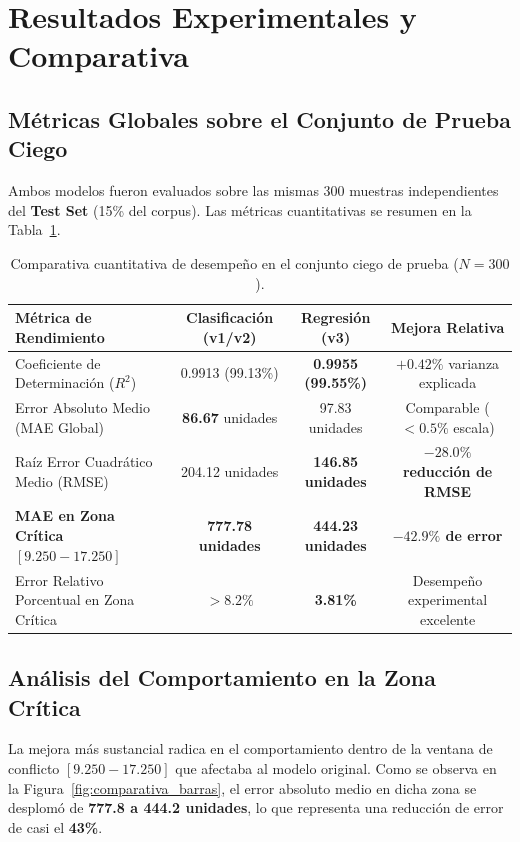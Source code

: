 \documentclass[11pt,a4paper]{article}
\begin{document}
\section{Resultados Experimentales y Comparativa}

\subsection{Métricas Globales sobre el Conjunto de Prueba Ciego}
Ambos modelos fueron evaluados sobre las mismas 300 muestras independientes del \textbf{Test Set} (15\% del corpus). Las métricas cuantitativas se resumen en la Tabla~\ref{tab:metricas_comparativas}.

\begin{table}[H]
\centering
\caption{Comparativa cuantitativa de desempeño en el conjunto ciego de prueba ($N = 300$).}
\label{tab:metricas_comparativas}
\vspace{0.2cm}
\begin{tabular}{lccc}
\toprule
\textbf{Métrica de Rendimiento} & \textbf{Clasificación (v1/v2)} & \textbf{Regresión (v3)} & \textbf{Mejora Relativa} \\
\midrule
Coeficiente de Determinación ($R^2$) & 0.9913 (99.13\%) & \textbf{0.9955 (99.55\%)} & $+0.42\%$ varianza explicada \\
Error Absoluto Medio (MAE Global) & \textbf{86.67} unidades & 97.83 unidades & Comparable ($<0.5\%$ escala) \\
Raíz Error Cuadrático Medio (RMSE) & 204.12 unidades & \textbf{146.85 unidades} & \textbf{$-28.0\%$ reducción de RMSE} \\
\midrule
\textbf{MAE en Zona Crítica $[9.250 - 17.250]$} & \textbf{777.78 unidades} & \textbf{444.23 unidades} & \textbf{$-42.9\%$ de error} \\
Error Relativo Porcentual en Zona Crítica & $> 8.2\%$ & \textbf{3.81\%} & Desempeño experimental excelente \\
\bottomrule
\end{tabular}
\end{table}

\subsection{Análisis del Comportamiento en la Zona Crítica}
La mejora más sustancial radica en el comportamiento dentro de la ventana de conflicto $[9.250 - 17.250]$ que afectaba al modelo original. Como se observa en la Figura~\ref{fig:comparativa_barras}, el error absoluto medio en dicha zona se desplomó de \textbf{777.8 a 444.2 unidades}, lo que representa una reducción de error de casi el \textbf{43\%}.
\end{document}
